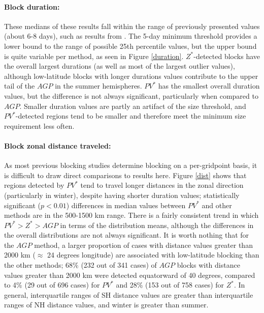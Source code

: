 \documentclass[smallextended]{svjour3}       %
\numberwithin{equation}{section}
\begin{document}
\paragraph{Block duration:} These medians of these results fall within the range of previously presented values (about 6-8 days), such as results from \citealt{wiedenmann_climatology_2002}. The 5-day minimum threshold provides a lower bound to the range of possible 25th percentile values, but the upper bound is quite variable per method, as seen in Figure \ref{duration}.  $Z^*$-detected blocks have the overall largest durations (as well as most of the largest outlier values), although low-latitude blocks with longer durations values contribute to the upper tail of the $AGP$ in the summer hemispheres. $PV^*$ has the smallest overall duration values, but the difference is not always significant, particularly when compared to $AGP$.  Smaller duration values are partly an artifact of the size threshold, and $PV^*$-detected regions tend to be smaller and therefore meet the minimum size requirement less often.  

 
\paragraph{Block zonal distance traveled:} As most previous blocking studies determine blocking on a per-gridpoint basis, it is difficult to draw direct comparisons to results here. Figure \ref{dist} shows that regions detected by $PV^*$ tend to travel longer distances in the zonal direction (particularly in winter), despite having shorter duration values; statistically significant ($p<0.01$) differences in median values between $PV^*$ and other methods are in the 500-1500 km range. There is a fairly consistent trend in which $PV^*>Z^*>AGP$ in terms of the distribution means, although the differences in the overall distributions are not always significant. It is worth nothing that for the $AGP$ method, a larger proportion of cases with distance values greater than 2000 km ($\approx$ 24 degrees longitude) are associated with low-latitude blocking than the other methods; 68\% (232 out of 341 cases) of $AGP$ blocks with distance values greater than 2000 km were detected equatorward of 40 degrees, compared to 4\% (29 out of 696 cases) for $PV^*$ and 28\% (153 out of 758 cases) for $Z^*$. In general, interquartile ranges of SH distance values are greater than interquartile ranges of NH distance values, and winter is greater than summer.
\end{document}
